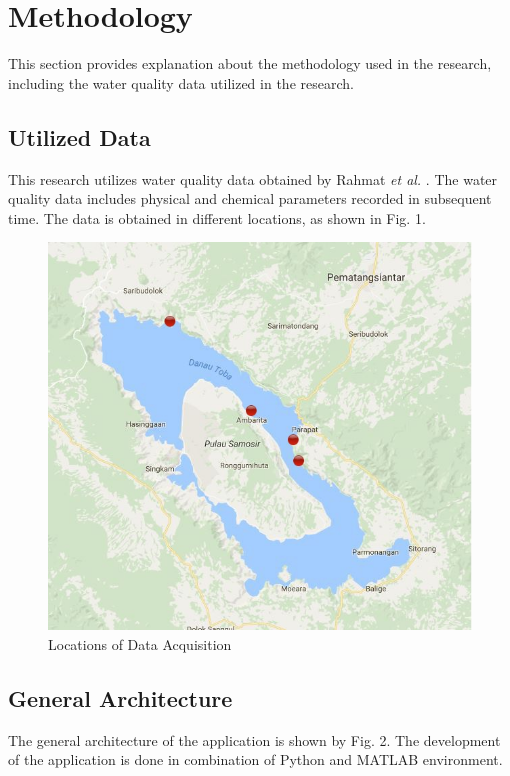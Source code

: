 \documentclass[journal,comsoc]{IEEEtran}
\let\MYoriglatexcaption\caption
\renewcommand{\caption}[2][\relax]{\MYoriglatexcaption[#2]{#2}}
\begin{document}
\section{Methodology}

This section provides explanation about the methodology used in the research, including the water quality data utilized in the research.

\subsection{Utilized Data}

This research utilizes water quality data obtained by Rahmat {\it et al.} \cite{Rahmat16}. The water quality data includes physical and chemical parameters recorded in subsequent time. The data is obtained in different locations, as shown in Fig. 1.

\begin{figure}[!th]
\centering
\includegraphics[scale=0.2]{map_data_acquisition.jpg}
\caption{Locations of Data Acquisition \cite{Rahmat16}}
\label{fig1}
\end{figure}

\subsection{General Architecture}

The general architecture of the application is shown by Fig. 2. The development of the application is done in combination of Python and MATLAB environment.
\end{document}
